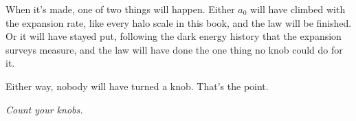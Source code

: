 When it's made, one of two things will happen. Either $a_0$ will have climbed with the expansion rate, like every halo scale in this book, and the law will be finished. Or it will have stayed put, following the dark energy history that the expansion surveys measure, and the law will have done the one thing no knob could do for it.

Either way, nobody will have turned a knob. That's the point.

\bigskip
\begin{center}
\emph{Count your knobs.}
\end{center}
